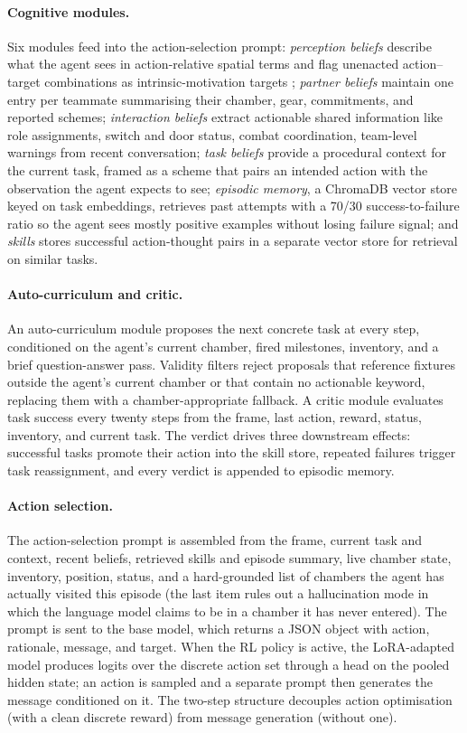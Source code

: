 \paragraph{Cognitive modules.}
Six modules feed into the action-selection prompt: \emph{perception beliefs} describe what the agent sees in action-relative spatial terms and flag unenacted action--target combinations as intrinsic-motivation targets \cite{georgeon2012interactional}; \emph{partner beliefs} maintain one entry per teammate summarising their chamber, gear, commitments, and reported schemes; \emph{interaction beliefs} extract actionable shared information like role assignments, switch and door status, combat coordination, team-level warnings from recent conversation; \emph{task beliefs} provide a procedural context for the current task, framed as a scheme that pairs an intended action with the observation the agent expects to see; \emph{episodic memory}, a ChromaDB vector store keyed on task embeddings, retrieves past attempts with a 70/30 success-to-failure ratio so the agent sees mostly positive examples without losing failure signal; and \emph{skills} stores successful action-thought pairs in a separate vector store for retrieval on similar tasks.

\paragraph{Auto-curriculum and critic.}
An auto-curriculum module proposes the next concrete task at every step, conditioned on the agent's current chamber, fired milestones, inventory, and a brief question-answer pass. Validity filters reject proposals that reference fixtures outside the agent's current chamber or that contain no actionable keyword, replacing them with a chamber-appropriate fallback. A critic module evaluates task success every twenty steps from the frame, last action, reward, status, inventory, and current task. The verdict drives three downstream effects: successful tasks promote their action into the skill store, repeated failures trigger task reassignment, and every verdict is appended to episodic memory.

\paragraph{Action selection.}
The action-selection prompt is assembled from the frame, current task and context, recent beliefs, retrieved skills and episode summary, live chamber state, inventory, position, status, and a hard-grounded list of chambers the agent has actually visited this episode (the last item rules out a hallucination mode in which the language model claims to be in a chamber it has never entered). The prompt is sent to the base model, which returns a JSON object with action, rationale, message, and target. When the RL policy is active, the LoRA-adapted model produces logits over the discrete action set through a head on the pooled hidden state; an action is sampled and a separate prompt then generates the message conditioned on it. The two-step structure decouples action optimisation (with a clean discrete reward) from message generation (without one).

